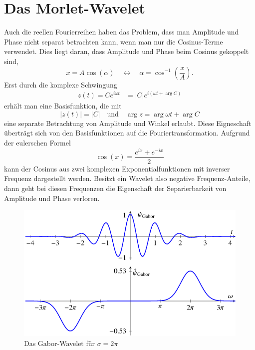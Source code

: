 \section{Das Morlet-Wavelet}
Auch die reellen Fourierreihen haben das Problem, dass man Amplitude und Phase nicht separat betrachten kann, wenn man nur die Cosinus-Terme verwendet.
Dies liegt daran, dass Amplitude und Phase beim Cosinus gekoppelt sind,
\[
x = A\cos(\alpha) \quad\leftrightarrow\quad \alpha = \cos^{-1}\left(\frac{x}{A}\right).
\]
Erst durch die komplexe Schwingung 
\begin{align*}
	z(t) = Ce^{i\omega t} &= |C|e^{i\left(\omega t + \arg C\right)}
\end{align*}
erhält man eine Basisfunktion, die mit
\[
	|z(t)| = |C| \quad \text{und}\quad
	\arg z = \arg \omega t + \arg C
\]
eine separate Betrachtung von Amplitude und Winkel erlaubt.
Diese Eigneschaft überträgt sich von den Basisfunktionen auf die Fouriertransformation.
Aufgrund der eulerschen Formel
\begin{equation}
	\cos(x) = \frac{e^{ix} + e^{-ix}}{2}\label{complex:euler}
\end{equation}
kann der Cosinus aus zwei komplexen Exponentialfunktionen mit inverser Frequenz dargestellt werden.
Besitzt ein Wavelet also negative Frequenz-Anteile, dann geht bei diesen Frequenzen die Eigenschaft der Separierbarkeit von Amplitude und Phase verloren.

\begin{figure}
	\centering
	\includegraphics{papers/complex/images/gabor.pdf}
	\caption{Das Gabor-Wavelet für $\sigma = 2\pi$ \label{complex:gabor}}
\end{figure}

